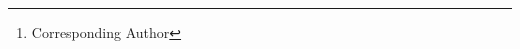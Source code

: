 \documentclass[preprint,1p,times,review]{elsarticle}
\begin{document}
%

\author{
\small{
Maha El Meseery \footnote{Corresponding Author} \textsuperscript{a}, Mahmoud
Fakhr El Din \textsuperscript{a}, Tarek abouldahab \textsuperscript{b}}\\
 \textsuperscript{a} \small{Signals Processing Group, Computers and Systems
Department,}\\ \small{ Electronic Research Institute, Cairo, Egypt.}\\
  \small {\textsuperscript{b}Cairo Metro Company ,
   Ministry of transport , Cairo, Egypt.}\\
   \small{melemseery@eri.sci.eg,  mafakhr@mcit.gov.eg, heshoaboda@hotmail.com
   }
}
\date{}
\end{document}

